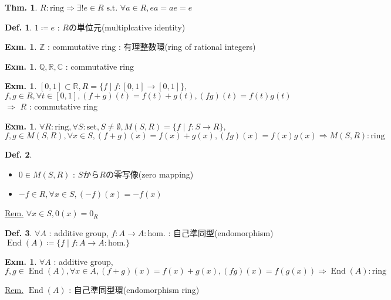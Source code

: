 \documentclass[uplatex,dvipdfmx,9pt]{beamer}
\newcommand{\st}{\text{ s.t. }}
\newcommand{\End}[1]{\operatorname{End}(#1)}
\renewcommand{\hom}{\text{hom.}} %
\newcommand{\Z}{\mathbb{Z}}
\newcommand{\Q}{\mathbb{Q}}
\newcommand{\R}{\mathbb{R}}
\newcommand{\C}{\mathbb{C}}
\newcounter{textExmCount}
\theoremstyle{definition} %
\newtheorem{defn}{Def.}[subsection] %
\newtheorem{thm}{Thm.}[subsection] %
\theoremstyle{example}
\newtheorem{exmText}[textExmCount]{Exm.}
\begin{document}
\begin{frame}

  \begin{thm}
    $R : \text{ring} \Rightarrow \exists! e \in R \st \forall a \in R, ea = ae = e$
  \end{thm}

  \begin{defn}
    $1 \coloneqq e$ : $R$の\alert{単位元(multiplcative identity)}
  \end{defn}

  \begin{exmText}
    $\Z$ : commutative ring : \alert{有理整数環(ring of rational integers)}
  \end{exmText}

  \begin{exmText}
    $\Q, \R, \C$ : commutative ring
  \end{exmText}

  \begin{exmText}
    $[0, 1] \subset \R, R = \{f \mid f\colon [0, 1] \to [0, 1]\},$ \\
    $f, g \in R, \forall t \in [0, 1], (f + g)(t) = f(t) + g(t), (fg)(t) = f(t)g(t)$ $\Rightarrow$ $R$ : commutative ring
  \end{exmText}

\end{frame}

\begin{frame}

  \begin{exmText}
    $\forall R : \text{ring}, \forall S : \text{set}, S \ne \emptyset, M(S, R) = \{f \mid f\colon S \to R\},$ \\
    $f, g \in M(S, R), \forall x \in S, (f + g)(x) = f(x) + g(x), (fg)(x) = f(x)g(x) \Rightarrow M(S, R) : \text{ring}$
  \end{exmText}

  \begin{defn}
    \begin{itemize}
      \item $0 \in M(S, R)$ : $S$から$R$の\alert{零写像(zero mapping)}
      \item $-f \in R, \forall x \in S, (-f)(x) = -f(x)$
    \end{itemize}
  \end{defn}
  \underline{Rem.} $\forall x \in S, 0(x) = 0_R$

  \begin{defn}
    $\forall A$ : additive group, $f\colon A \to A : \hom$ : \alert{自己準同型(endomorphism)} \\
    $\End{A} \coloneqq \{f \mid f\colon A \to A : \hom \}$
  \end{defn}

  \begin{exmText}
    $\forall A$ : additive group, \\
    $f, g \in \End{A}, \forall x \in A, (f + g)(x) = f(x) + g(x), (fg)(x) = f(g(x)) \Rightarrow \End{A} : \text{ring}$
  \end{exmText}
  \underline{Rem.} $\End{A}$ : \alert{自己準同型環(endomorphism ring)}

\end{frame}
\end{document}
